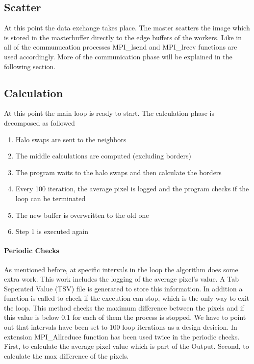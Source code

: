 \documentclass[12pt,a4paper]{article}
\begin{document}
    \subsection{Scatter}
        At this point the data exchange takes place. The master scatters the image which is stored in the masterbuffer directly to the edge buffers of the workers. Like in all of the communucation processes MPI\_Isend and MPI\_Irecv functions are used accordingly. More of the communication phase will be explained in the following section.

    \subsection{Calculation}
        At this point the main loop is ready to start. The calculation phase is decomposed as followed
        \begin{enumerate}
          \item Halo swaps are sent to the neighbors
          \item The middle calculations are computed (excluding borders)
          \item The program waits to the halo swaps and then calculate the borders
          \item Every 100 iteration, the average pixel is logged and the program checks if the loop can be terminated
          \item The new buffer is overwritten to the old one
          \item Step 1 is executed again
        \end{enumerate}

        \paragraph{Periodic Checks}
        	As mentioned before, at specific intervals in the loop the algorithm does some extra work. This work includes the logging of the average pixel's value. A Tab Seperated Value (TSV) file is generated to store this information. In addition a function is called to check if the execution can stop, which is the only way to exit the loop. This method checks the maximum difference between the pixels and if this value is below 0.1 for each of them the process is stopped. We have to point out that intervals have been set to 100 loop iterations as a design desicion. In extension MPI\_Allreduce function has been used twice in the periodic checks. First, to calculate the average pixel value which is part of the Output. Second, to calculate the max difference of the pixels.
\end{document}
